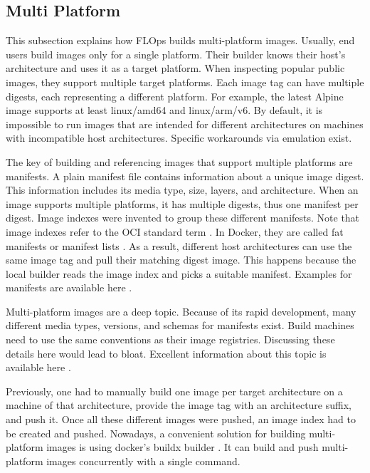 \subsection{Multi Platform}

This subsection explains how FLOps builds multi-platform images.
Usually, end users build images only for a single platform.
Their builder knows their host's architecture and uses it as a target platform.
When inspecting popular public images, they support multiple target platforms.
Each image tag can have multiple digests, each representing a different platform.
For example, the latest Alpine image \cite{alpine_multiplatform_image} supports at least linux/amd64 and linux/arm/v6.
By default, it is impossible to run images that are intended for different architectures on machines with incompatible host architectures.
Specific workarounds via emulation exist.

The key of building and referencing images that support multiple platforms are manifests.
A plain manifest file contains information about a unique image digest.
This information includes its media type, size, layers, and architecture.
When an image supports multiple platforms, it has multiple digests, thus one manifest per digest.
Image indexes were invented to group these different manifests.
Note that image indexes refer to the OCI standard term \cite{oci_image_index}.
In Docker, they are called fat manifests or manifest lists \cite{docs:docker_manifest}.
As a result, different host architectures can use the same image tag and pull their matching digest image.
This happens because the local builder reads the image index and picks a suitable manifest.
Examples for manifests are available here \cite{docs:docker_manifest}.

Multi-platform images are a deep topic.
Because of its rapid development, many different media types, versions, and schemas for manifests exist.
Build machines need to use the same conventions as their image registries.
Discussing these details here would lead to bloat.
Excellent information about this topic is available here \cite{docs:image_manifest_versions_schemas}.

Previously, one had to manually build one image per target architecture on a machine of that architecture, provide the image tag with an architecture suffix, and push it.
Once all these different images were pushed, an image index had to be created and pushed.
Nowadays, a convenient solution for building multi-platform images is using docker's buildx builder \cite{docs:docker_buildx}.
It can build and push multi-platform images concurrently with a single command.

